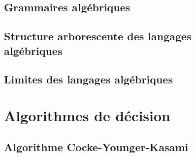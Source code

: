 \documentclass[9pt]{beamer}
\begin{document}
\subsection{Grammaires algébriques}





 
\subsection{Structure arborescente des langages algébriques}







% 
%
%
%
%
%
%
 
\subsection{Limites des langages algébriques}




\section{Algorithmes de décision}
 
\subsection{Algorithme Cocke-Younger-Kasami}




 
\end{document}
